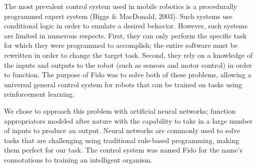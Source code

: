The most prevalent control system used in mobile robotics is a procedurally programmed expert system (Biggs \& MacDonald, 2003).  Such systems use conditional logic in order to emulate a desired behavior.  However, such systems are limited in numerous respects.  First, they can only perform the specific task for which they were programmed to accomplish; the entire software must be rewritten in order to change the target task.  Second, they rely on a knowledge of the inputs and outputs to the robot (such as sensors and motor control) in order to function.  The purpose of Fido was to solve both of these problems, allowing a universal general control system for robots that can be trained on tasks using reinforcement learning.

We chose to approach this problem with artificial neural networks; function appropriators modeled after nature with the capability to take in a large number of inputs to produce an output.  Neural networks are commonly used to solve tasks that are challenging using traditional rule-based programming, making them perfect for our task.  The control system was named Fido for the name's connotations to training an intelligent organism. 